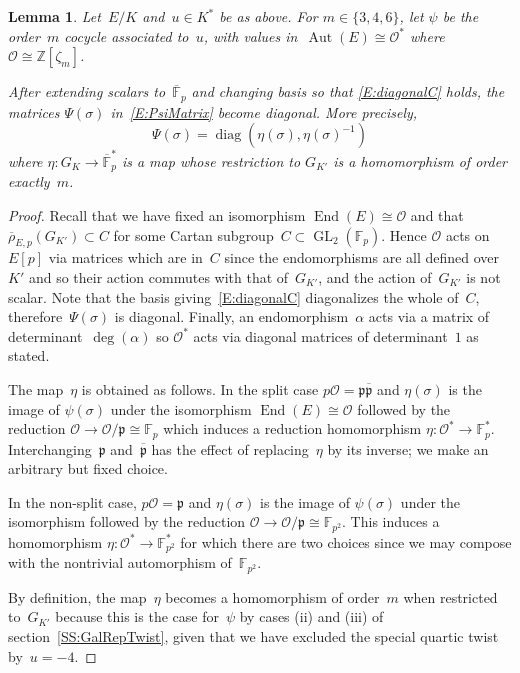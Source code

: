 \documentclass[12pt, reqno]{amsart}
\newcommand{\F}{\mathbb{F}}
\newcommand{\Fp}{\mathbb{F}_p}
\newcommand{\Fpstar}{\mathbb{F}_p^*}
\newcommand{\Fbar}{{\overline{\F}}}
\newcommand{\Z}{\mathbb{Z}}
\newcommand{\rhobar}{{\overline{\rho}}}
\newcommand{\frp}{{\mathfrak p}}
\newcommand{\calO}{\mathcal{O}}
\DeclareMathOperator{\Aut}{Aut}
\DeclareMathOperator{\End}{End}
\newcommand{\GL}{\operatorname{GL}}
\newcommand{\diag}{{\operatorname{diag}}}
\numberwithin{equation}{section}
\newtheorem{lemma}[theorem]{Lemma}
\theoremstyle{definition}
\theoremstyle{remark}
\begin{document}
\begin{lemma}\label{L:DiagonalPsi}
Let~$E/K$ and~$u\in K^*$ be as above.  For $m\in\{3,4,6\}$, let $\psi$
be the order~$m$ cocycle associated to~$u$, with values
in~$\Aut(E)\cong\calO^*$ where $\calO\cong\Z[\zeta_m]$.

After extending scalars to~$\Fbar_p$ and changing basis so that
\eqref{E:diagonalC} holds, the matrices $\Psi(\sigma)$
in~\eqref{E:PsiMatrix} become diagonal.  More precisely,
\[
\Psi(\sigma) = \diag(\eta(\sigma),\eta(\sigma)^{-1})
\]
where $\eta:G_K\to \overline{\F}_p^*$ is a map whose restriction to
$G_{K'}$ is a homomorphism of order exactly~$m$.
\end{lemma}
\begin{proof}
Recall that we have fixed an isomorphism 
$\End(E)\cong\calO$ and
that $\rhobar_{E,p}(G_{K'}) \subset C$ for some Cartan subgroup~$C \subset \GL_2(\Fp)$.
Hence $\calO$ acts on $E[p]$ 
via matrices which are in~$C$ since the endomorphisms
are all defined over~$K'$ and so their action commutes with that
of~$G_{K'}$, and the action of~$G_{K'}$ is not scalar. Note that the basis giving~\eqref{E:diagonalC} diagonalizes the whole of~$C$, therefore~$\Psi(\sigma)$ is diagonal. Finally,  
an endomorphism~$\alpha$ acts via a matrix of determinant~$\deg(\alpha)$ so $\calO^*$ acts via diagonal matrices of determinant~$1$ as stated.

The map~$\eta$ is obtained as follows.  In the split case
$p\calO=\frp\overline{\frp}$ and $\eta(\sigma)$ is the image of
$\psi(\sigma)$ under the isomorphism
$\End(E)\cong\calO$ followed by the reduction
$\calO\to\calO/\frp\cong\Fp$ which induces a reduction homomorphism
$\eta:\calO^*\to\Fpstar$.  Interchanging~$\frp$ and~$\overline{\frp}$
has the effect of replacing~$\eta$ by its inverse; we make an
arbitrary but fixed choice.

In the non-split case, $p\calO=\frp$ and 
$\eta(\sigma)$ is the image
of $\psi(\sigma)$ under the isomorphism followed by the reduction
$\calO\to\calO/\frp\cong\F_{p^2}$. 
This induces a 
homomorphism $\eta: \calO^*\to\F_{p^2}^*$ for which there are two
choices since we may compose with the nontrivial
automorphism of~$\F_{p^2}$.

By definition, the map~$\eta$ becomes a homomorphism of order~$m$ when restricted to~$G_{K'}$ because this is the case for~$\psi$ by cases (ii) and (iii) 
of section~\ref{SS:GalRepTwist}, given that we have excluded the special quartic twist by~$u=-4$.
\end{proof}
\end{document}
